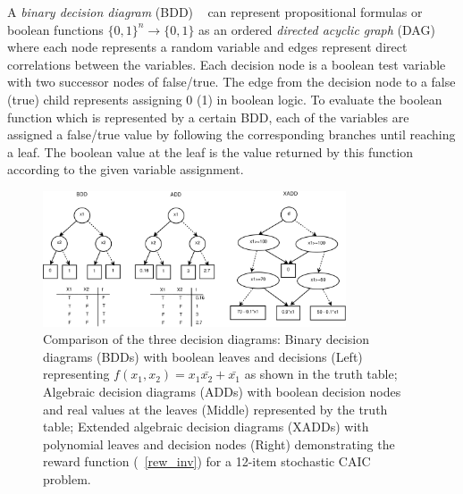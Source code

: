 \documentclass[twoside,11pt]{article}
\begin{document}
A \emph{binary decision diagram} (BDD) ~\cite{bryant} can represent propositional formulas or boolean functions $\lbrace 0,1\rbrace^n \rightarrow \lbrace 0,1\rbrace$ as an ordered \emph{directed acyclic graph} (DAG) where each node represents a random variable and edges represent direct correlations between the variables. Each decision node is a boolean test variable with two successor nodes of false/true. The edge from the decision node to a false (true) child represents assigning  0 (1) in boolean logic. To evaluate the boolean function which is represented by a certain BDD, each of the variables are assigned a false/true value by following the corresponding branches until reaching a leaf. The boolean value at the leaf is the value returned by this function according to the given variable assignment. 
\vspace{10mm}
\begin{figure}[t!]
\centering
\vspace{-3mm}
\includegraphics[width=0.8\textwidth]{Figures1/diagrams/bdd_add_xadd.pdf}
\vspace{-2mm}

\caption{\footnotesize Comparison of the three decision diagrams: Binary decision diagrams (BDDs) with boolean leaves and decisions (Left) representing $f(x_1,x_2) = x_1\bar{x_2}+\bar{x_1}$ as shown in the truth table; Algebraic decision diagrams (ADDs) with  boolean decision nodes and real values at the leaves (Middle) represented by the truth table; Extended algebraic decision diagrams (XADDs) with polynomial leaves and decision nodes (Right) demonstrating the reward function (~\ref{rew_inv}) for a 12-item stochastic CAIC problem.}
\label{fig:bdd_add_xadd}
\vspace{-6mm}
\end{figure}
\vspace{-6mm}
\end{document}
